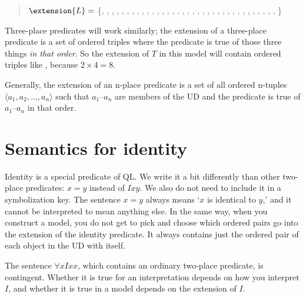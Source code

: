 \begin{quote}
$\extension{L}=$ \{, , , , , , , ,
, , , , , , ,
, , , , , ,
, , , , ,
, , , ,
, , ,
, ,
%
\}
\end{quote}

Three-place predicates will work similarly; the extension of a three-place predicate is a set of ordered triples where the predicate is true of those three things \emph{in that order}. So the extension of $T$ in this model will contain ordered triples like , because $2\times 4 = 8$.

Generally, the extension of an n-place predicate is a set of all ordered n-tuples ${\langle}a_1, a_2,\ldots, a_n{\rangle}$ such that $a_1$--$a_n$ are members of the UD and the predicate is true of $a_1$--$a_n$ in that order.






\section{Semantics for identity}
Identity is a special predicate of QL. We write it a bit differently than other two-place predicates: $x=y$ instead of $Ixy$. We also do not need to include it in a symbolization key. The sentence $x=y$ always means `$x$ is identical to $y$,'  and it cannot be interpreted to mean anything else. In the same way, when you construct a model, you do not get to pick and choose which ordered pairs go into the extension of the identity predicate. It always contains just the ordered pair of each object in the UD with itself.

The sentence $\forall x Ixx$, which contains an ordinary two-place predicate, is contingent. Whether it is true for an interpretation depends on how you interpret $I$, and whether it is true in a model depends on the extension of $I$.

